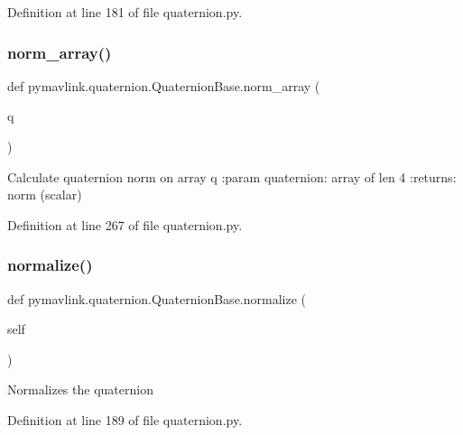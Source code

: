 Definition at line 181 of file quaternion.\+py.

\mbox{\label{classpymavlink_1_1quaternion_1_1QuaternionBase_a2de35cb9d1f25dabffe8706230ec2a8a}} 
\subsubsection{\texorpdfstring{norm\_array()}{norm\_array()}}
{\footnotesize\ttfamily def pymavlink.\+quaternion.\+Quaternion\+Base.\+norm\+\_\+array (\begin{DoxyParamCaption}\item[{}]{q }\end{DoxyParamCaption})\hspace{0.3cm}{\ttfamily [static]}}

\begin{DoxyVerb}Calculate quaternion norm on array q
:param quaternion: array of len 4
:returns: norm (scalar)
\end{DoxyVerb}
 

Definition at line 267 of file quaternion.\+py.

\mbox{\label{classpymavlink_1_1quaternion_1_1QuaternionBase_aec2e9571fc65fcda925d8be556ce949b}} 
\subsubsection{\texorpdfstring{normalize()}{normalize()}}
{\footnotesize\ttfamily def pymavlink.\+quaternion.\+Quaternion\+Base.\+normalize (\begin{DoxyParamCaption}\item[{}]{self }\end{DoxyParamCaption})}

\begin{DoxyVerb}Normalizes the quaternion\end{DoxyVerb}
 

Definition at line 189 of file quaternion.\+py.


